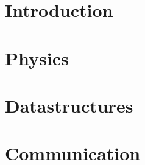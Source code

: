 \documentclass{article}
\begin{document}

\section{Introduction} \label{s:intro}

\section{Physics} \label{s:physics}

\section{Datastructures} \label{s:datastructures}

\section{Communication} \label{s:communication}
\end{document}
